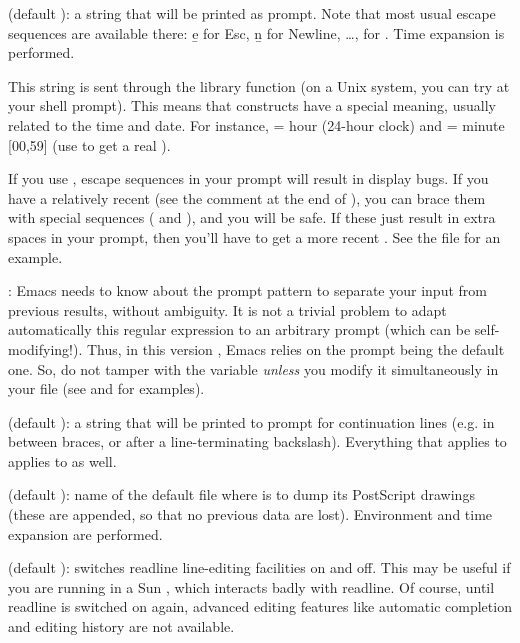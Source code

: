  (default ): a string that will be printed as
prompt. Note that most usual escape sequences are available there: \b{e} for
Esc, \b{n} for Newline, \dots, \kbd{\bs\bs} for \kbd{\bs}. Time expansion is
performed.

This string is sent through the library function  (on a
Unix system, you can try  at your shell prompt). This means
that \kbd{\%} constructs have a special meaning, usually related to the time
and date. For instance,  = hour (24-hour clock) and  =
minute [00,59] (use \kbd{\%\%} to get a real \kbd{\%}).

If you use , escape sequences in your prompt will result in
display bugs. If you have a relatively recent  (see the comment
at the end of ), you can brace them with special sequences
(\kbd{\bs[} and \kbd{\bs]}), and you will be safe. If these just result in
extra spaces in your prompt, then you'll have to get a more recent
. See the file  for an example.

: Emacs needs to know about the prompt pattern to
separate your input from previous  results, without ambiguity. It is
not a trivial problem to adapt automatically this regular expression to an
arbitrary prompt (which can be self-modifying!). Thus, in this version \vers,
Emacs relies on the prompt being the default one. So, do not tamper with the
 variable \emph{unless} you modify it simultaneously in your
 file (see  and  for
examples).

 (default ): a string that will be printed
to prompt for continuation lines (e.g. in between braces, or after a
line-terminating backslash). Everything that applies to 
applies to  as well.

 (default ): name of the default file where
 is to dump its PostScript drawings (these are appended, so that no
previous data are lost). Environment and time expansion are performed.

 (default ): switches readline line-editing
facilities on and off. This may be useful if you are running  in a Sun
, which interacts badly with readline. Of course, until readline
is switched on again, advanced editing features like automatic completion
and editing history are not available.

